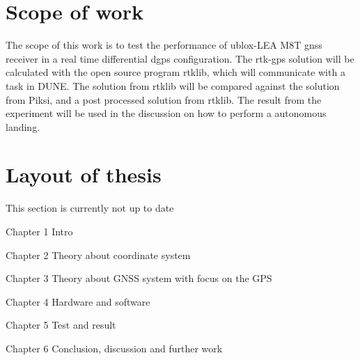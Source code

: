 \section{Scope of work}
The scope of this work is to test the performance of ublox-LEA M8T \gls{gnss} receiver in a real time differential \gls{dgps} configuration. The \gls{rtk-gps} solution will be calculated with the open source program rtklib, which will communicate with a task in DUNE. The solution from rtklib will be compared against the solution from Piksi, and a post processed solution from rtklib. The result from the experiment will be used in the discussion on how to perform a autonomous landing.


\section{Layout of thesis}
This section is currently not up to date

Chapter 1 Intro

Chapter 2 Theory about coordinate system

Chapter 3 Theory about GNSS system with focus on the GPS

Chapter 4 Hardware and software

Chapter 5 Test and result

Chapter 6 Conclusion, discussion and further work


